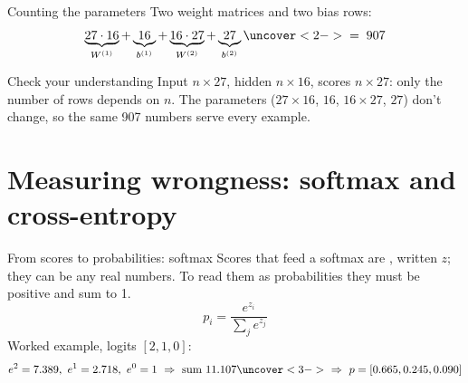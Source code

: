 \documentclass[aspectratio=169,11pt,t,\primeropts]{beamer}
\begin{document}
\begin{frame}{Counting the parameters}
  Two weight matrices and two bias rows:
  \[
    \underbrace{27 \cdot 16}_{W^{(1)}} + \underbrace{16}_{b^{(1)}}
    + \underbrace{16 \cdot 27}_{W^{(2)}} + \underbrace{27}_{b^{(2)}}
    \uncover<2->{\;=\; 907}
  \]
  \vspace{5mm}
\end{frame}

\begin{frame}{Check your understanding}
  {Input $n \times 27$, hidden $n \times 16$, scores $n \times 27$: only the number of rows
    depends on $n$. The parameters ($27 \times 16$, $16$, $16 \times 27$, $27$) don't change,
    so the same 907 numbers serve every example.}
\end{frame}

\section{Measuring wrongness: softmax and cross-entropy}

\begin{frame}{From scores to probabilities: softmax}
  Scores that feed a softmax are , written $z$; they can be any real numbers. To
  read them as probabilities they must be positive and sum to 1.
  \[ p_i = \frac{e^{z_i}}{\sum_j e^{z_j}} \]
  \pause
  Worked example, logits $[2, 1, 0]$:
  \[ e^2 = 7.389,\ e^1 = 2.718,\ e^0 = 1 \ \Rightarrow\ \text{sum } 11.107
    \uncover<3->{\ \Rightarrow\ p = [0.665, 0.245, 0.090]} \]
  \vspace{-2mm}
\end{frame}
\end{document}
